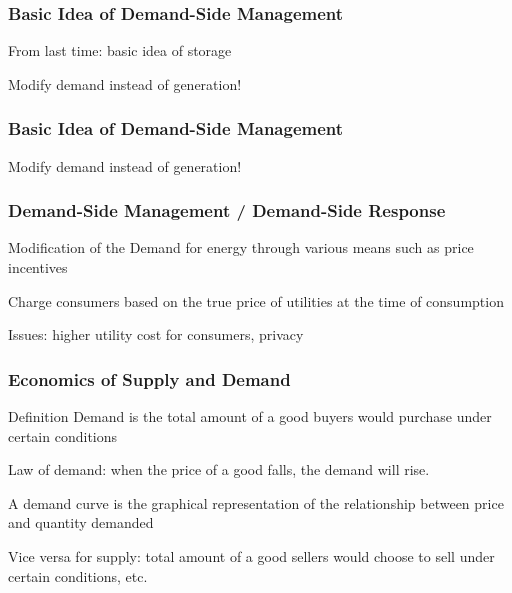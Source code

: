 \documentclass[10pt,aspectratio=169,dvipsnames]{beamer}
\begin{document}
\begin{frame}
  \frametitle{Basic Idea of Demand-Side Management}

From last time: basic idea of storage
  \vspace{0.5cm}

  Modify demand instead of generation!
\end{frame}
\begin{frame}
  \frametitle{Basic Idea of Demand-Side Management}

 Modify demand instead of generation!
  \vspace{0.5cm}


\end{frame}

\begin{frame}
  \frametitle{Demand-Side Management / Demand-Side Response}

  Modification of the Demand for energy through various means such as price incentives

  Charge consumers based on the true price of utilities at the time of consumption

  Issues: higher utility cost for consumers, privacy

\end{frame}


\begin{frame}
 \frametitle{Economics of Supply and Demand}
 \begin{block}{Definition}
  Demand is the total amount of a good buyers would purchase under certain conditions
 \end{block}

 Law of demand: when the price of a good falls, the demand will rise.

 A demand curve is the graphical representation of the relationship between price and quantity demanded

 Vice versa for supply: total amount of a good sellers would choose to sell under certain conditions, etc.
\end{frame}
\end{document}
